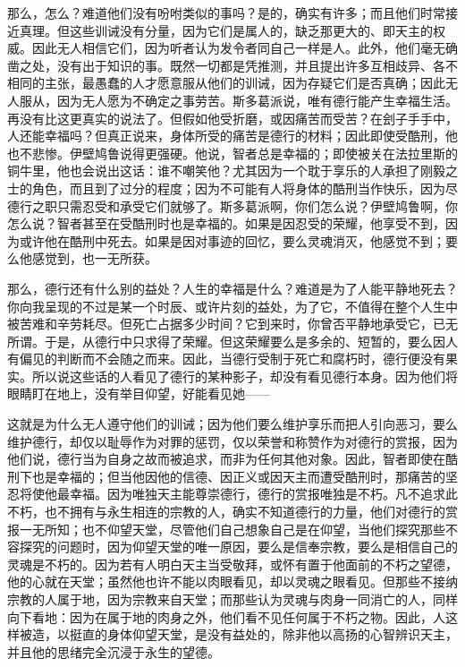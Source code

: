 那么，怎么？难道他们没有吩咐类似的事吗？是的，确实有许多；而且他们时常接近真理。但这些训诫没有分量，因为它们是属人的，缺乏那更大的、即天主的权威。因此无人相信它们，因为听者认为发令者同自己一样是人。此外，他们毫无确凿之处，没有出于知识的事。既然一切都是凭推测，并且提出许多互相歧异、各不相同的主张，最愚蠢的人才愿意服从他们的训诫，因为存疑它们是否真确；因此无人服从，因为无人愿为不确定之事劳苦。斯多葛派说，唯有德行能产生幸福生活。再没有比这更真实的说法了。但假如他受折磨，或因痛苦而受苦？在刽子手手中，人还能幸福吗？但真正说来，身体所受的痛苦是德行的材料；因此即使受酷刑，他也不悲惨。伊壁鸠鲁说得更强硬。他说，智者总是幸福的；即使被关在法拉里斯的铜牛里，他也会说出这话：谁不嘲笑他？尤其因为一个耽于享乐的人承担了刚毅之士的角色，而且到了过分的程度；因为不可能有人将身体的酷刑当作快乐，因为尽德行之职只需忍受和承受它们就够了。斯多葛派啊，你们怎么说？伊壁鸠鲁啊，你怎么说？智者甚至在受酷刑时也是幸福的。如果是因忍受的荣耀，他享受不到，因为或许他在酷刑中死去。如果是因对事迹的回忆，要么灵魂消灭，他感觉不到；要么他感觉到，也一无所获。\par

那么，德行还有什么别的益处？人生的幸福是什么？难道是为了人能平静地死去？你向我呈现的不过是某一个时辰、或许片刻的益处，为了它，不值得在整个人生中被苦难和辛劳耗尽。但死亡占据多少时间？它到来时，你曾否平静地承受它，已无所谓。于是，从德行中只求得了荣耀。但这荣耀要么是多余的、短暂的，要么因人有偏见的判断而不会随之而来。因此，当德行受制于死亡和腐朽时，德行便没有果实。所以说这些话的人看见了德行的某种影子，却没有看见德行本身。因为他们将眼睛盯在地上，没有举目仰望，好能看见她——\par

\par

这就是为什么无人遵守他们的训诫；因为他们要么维护享乐而把人引向恶习，要么维护德行，却仅以耻辱作为对罪的惩罚，仅以荣誉和称赞作为对德行的赏报，因为他们说，德行当为自身之故而被追求，而非为任何其他对象。因此，智者即使在酷刑下也是幸福的；但当他因他的信德、因正义或因天主而遭受酷刑时，那痛苦的坚忍将使他最幸福。因为唯独天主能尊崇德行，德行的赏报唯独是不朽。凡不追求此不朽，也不拥有与永生相连的宗教的人，确实不知道德行的力量，他们对德行的赏报一无所知；也不仰望天堂，尽管他们自己想象自己是在仰望，当他们探究那些不容探究的问题时，因为仰望天堂的唯一原因，要么是信奉宗教，要么是相信自己的灵魂是不朽的。因为若有人明白天主当受敬拜，或怀有置于他面前的不朽之望德，他的心就在天堂；虽然他也许不能以肉眼看见，却以灵魂之眼看见。但那些不接纳宗教的人属于地，因为宗教来自天堂；而那些认为灵魂与肉身一同消亡的人，同样向下看地：因为在属于地的肉身之外，他们看不见任何属于不朽之物。因此，人这样被造，以挺直的身体仰望天堂，是没有益处的，除非他以高扬的心智辨识天主，并且他的思绪完全沉浸于永生的望德。\par

